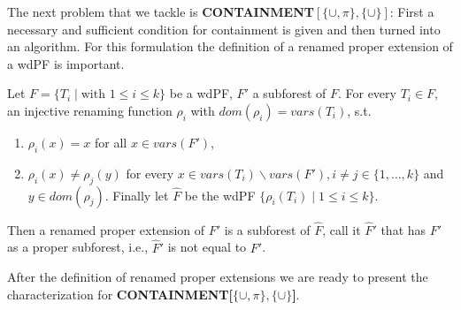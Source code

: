 The next problem that we tackle is \textbf{CONTAINMENT$[\{\cup,\pi\},\{\cup\}]$}: First
a necessary and sufficient condition for containment is given and then turned
into an algorithm. For this formulation the definition of a renamed proper
extension of a wdPF is important.
\begin{definition}
	Let $F = \{ T_i \mid \mbox{with } 1\leq i \leq k\}$ be a wdPF, $F'$ a
	subforest of $F$. For every $T_i \in F$, an injective renaming function
	$\rho_i$ with $dom(\rho_i) = vars(T_i)$, s.t. 
	\begin{enumerate}
		\item $\rho_i(x) = x$ for all $x \in vars(F')$,
		\item $\rho_i(x) \neq \rho_j(y)$ for every $x \in vars(T_i) \backslash
			vars(F'),i\neq j \in \{ 1, \dots, k\}$ and $y \in dom(\rho_j)$.
			Finally let $\hat{F}$ be the wdPF $\{ \rho_i(T_i) \mid 1 \leq i \leq
			k\}$. 
	\end{enumerate}
	Then a renamed proper extension of $F'$ is a subforest of
	$\hat{F}$, call it $\hat{F}'$ that has $F'$ as a proper subforest, i.e.,
	$\hat{F}'$ is not equal to $F'$.
\end{definition}

After the definition of renamed proper extensions we are ready to present the
characterization for \textbf{CONTAINMENT[$\{\cup,\pi\},\{\cup\}$]}.

